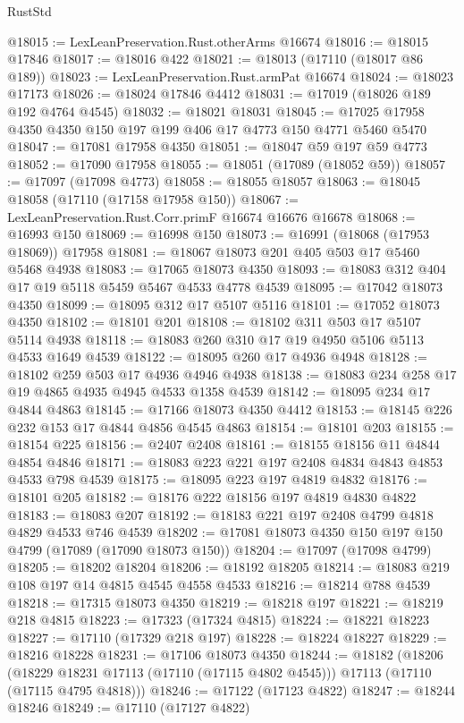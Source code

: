 \begin{lexlean}{RustStd}
\begin{coremodule}
@18015 := LexLeanPreservation.Rust.otherArms @16674
@18016 := @18015 @17846
@18017 := @18016 @422
@18021 := @18013 (@17110 (@18017 @86 @189))
@18023 := LexLeanPreservation.Rust.armPat @16674
@18024 := @18023 @17173
@18026 := @18024 @17846 @4412
@18031 := @17019 (@18026 @189 @192 @4764 @4545)
@18032 := @18021 @18031
@18045 := @17025 @17958 @4350 @4350 @150 @197 @199 @406 @17 @4773 @150 @4771 @5460 @5470
@18047 := @17081 @17958 @4350
@18051 := @18047 @59 @197 @59 @4773
@18052 := @17090 @17958
@18055 := @18051 (@17089 (@18052 @59))
@18057 := @17097 (@17098 @4773)
@18058 := @18055 @18057
@18063 := @18045 @18058 (@17110 (@17158 @17958 @150))
@18067 := LexLeanPreservation.Rust.Corr.primF @16674 @16676 @16678
@18068 := @16993 @150
@18069 := @16998 @150
@18073 := @16991 (@18068 (@17953 @18069)) @17958
@18081 := @18067 @18073 @201 @405 @503 @17 @5460 @5468 @4938
@18083 := @17065 @18073 @4350
@18093 := @18083 @312 @404 @17 @19 @5118 @5459 @5467 @4533 @4778 @4539
@18095 := @17042 @18073 @4350
@18099 := @18095 @312 @17 @5107 @5116
@18101 := @17052 @18073 @4350
@18102 := @18101 @201
@18108 := @18102 @311 @503 @17 @5107 @5114 @4938
@18118 := @18083 @260 @310 @17 @19 @4950 @5106 @5113 @4533 @1649 @4539
@18122 := @18095 @260 @17 @4936 @4948
@18128 := @18102 @259 @503 @17 @4936 @4946 @4938
@18138 := @18083 @234 @258 @17 @19 @4865 @4935 @4945 @4533 @1358 @4539
@18142 := @18095 @234 @17 @4844 @4863
@18145 := @17166 @18073 @4350 @4412
@18153 := @18145 @226 @232 @153 @17 @4844 @4856 @4545 @4863
@18154 := @18101 @203
@18155 := @18154 @225
@18156 := @2407 @2408
@18161 := @18155 @18156 @11 @4844 @4854 @4846
@18171 := @18083 @223 @221 @197 @2408 @4834 @4843 @4853 @4533 @798 @4539
@18175 := @18095 @223 @197 @4819 @4832
@18176 := @18101 @205
@18182 := @18176 @222 @18156 @197 @4819 @4830 @4822
@18183 := @18083 @207
@18192 := @18183 @221 @197 @2408 @4799 @4818 @4829 @4533 @746 @4539
@18202 := @17081 @18073 @4350 @150 @197 @150 @4799 (@17089 (@17090 @18073 @150))
@18204 := @17097 (@17098 @4799)
@18205 := @18202 @18204
@18206 := @18192 @18205
@18214 := @18083 @219 @108 @197 @14 @4815 @4545 @4558 @4533
@18216 := @18214 @788 @4539
@18218 := @17315 @18073 @4350
@18219 := @18218 @197
@18221 := @18219 @218 @4815
@18223 := @17323 (@17324 @4815)
@18224 := @18221 @18223
@18227 := @17110 (@17329 @218 @197)
@18228 := @18224 @18227
@18229 := @18216 @18228
@18231 := @17106 @18073 @4350
@18244 := @18182
    (@18206
      (@18229 @18231 @17113 (@17110 (@17115 @4802 @4545)))
      @17113
      (@17110 (@17115 @4795 @4818)))
@18246 := @17122 (@17123 @4822)
@18247 := @18244 @18246
@18249 := @17110 (@17127 @4822)

\end{coremodule}
\end{lexlean}
